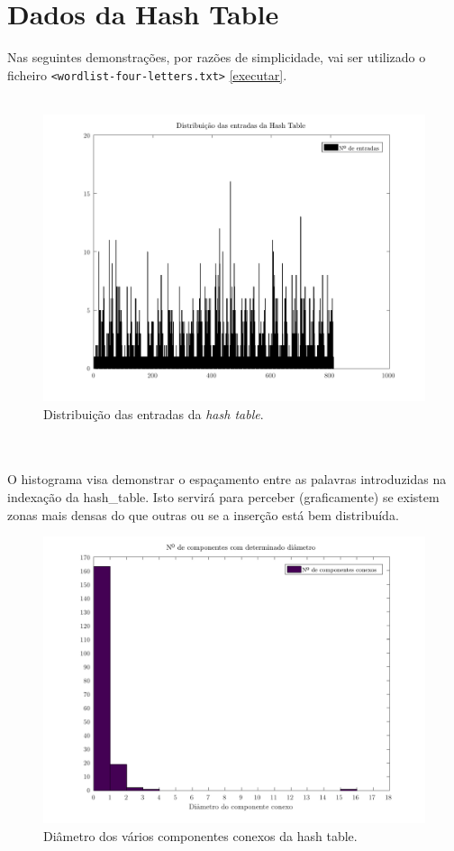 	\section{Dados da Hash Table}
	Nas seguintes demonstrações, por razões de simplicidade, vai ser utilizado o ficheiro \verb|<wordlist-four-letters.txt>| \ref{executar}.\\\\
	\begin{figure}[h!]
    \centering
    \includegraphics[scale=0.60]{hash_table_entries.pdf}
    \caption{Distribuição das entradas da \textit{hash table}.}
	\end{figure}\\\\
	O histograma visa demonstrar o espaçamento entre as palavras introduzidas na indexação da hash\_table. Isto servirá para perceber (graficamente) se existem zonas mais densas do que outras ou se a inserção está bem distribuída.
\pagebreak
	\begin{figure}[h!]
    \centering
    \includegraphics[scale=0.60]{diamComponenteconexo.pdf}
    \caption{Diâmetro dos vários componentes conexos da hash table.}
	\end{figure}\\\\
